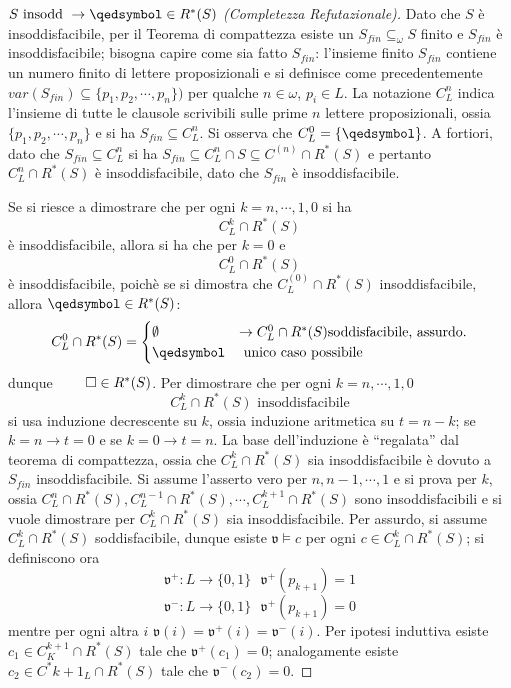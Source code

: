 \begin{proof}[$S \text{ insodd } \rightarrow \qedsymbol \in R^*(S)$ (Completezza Refutazionale)]
        Dato che $S$ è insoddisfacibile, per il Teorema di compattezza esiste 
        un $S_{fin} \subseteq_{\omega} S$ finito e $S_{fin}$ è insoddisfacibile; 
        bisogna capire come sia fatto $S_{fin}$: l'insieme finito $S_{fin}$ contiene 
        un numero finito di lettere proposizionali e si definisce come precedentemente 
        $var(S_{fin}) \subseteq \{p_1, p_2, \cdots, p_n\})$ per qualche $n \in  \omega$, 
        $p_i \in L$.
        La notazione $C^{n}_L$ indica l'insieme di tutte le clausole scrivibili 
        sulle prime $n$ lettere proposizionali, ossia $\{p_1, p_2, \cdots, p_n\}$  
        e si ha $S_{fin} \subseteq C^{n}_L$. 
        Si osserva che $C^{0}_L = \{ \qedsymbol \}$. A fortiori, dato che 
        $S_{fin} \subseteq C^{n}_L$ si ha $S_{fin} \subseteq C^{n}_L \cap S \subseteq C^{(n)} \cap R^*(S)$
        e pertanto $C^{n}_L \cap R^*(S)$ è insoddisfacibile, dato che $S_{fin}$ è 
        insoddisfacibile. 

        Se si riesce a dimostrare che per ogni $ k = n, \cdots, 1,0$ si ha 
        $$
        C^k_L \cap R^*(S)
        $$
        è insoddisfacibile, allora si ha che per $k = 0$ e 
        $$
        C^{0}_L \cap R^*(S)
        $$
        è insoddisfacibile, poichè se si dimostra che $C^(0)_L \cap R^*(S)$ 
        insoddisfacibile, allora $\qedsymbol \in R^*(S)$: 
        $$
        C^{0}_L \cap R^*(S) = 
        \begin{cases}
        \emptyset  & \rightarrow C^0_L \cap R^*(S) \text{soddisfacibile, assurdo.} \\
        \qedsymbol & \text{ unico caso possibile }
        \end{cases}
        $$
        dunque $\qed \in R^*(S)$. Per dimostrare che 
        per ogni $k = n, \cdots, 1, 0$ 
        $$
        C^k_L \cap R^*(S) \text{ insoddisfacibile} 
        $$
        si usa induzione decrescente su $k$, ossia induzione aritmetica 
        su $t = n - k$; se $k = n \rightarrow t = 0$ e se $k = 0 \rightarrow t = n$. 
        La base dell'induzione è ``regalata'' dal teorema di compattezza, 
        ossia che $C^k_L \cap R^*(S)$ sia insoddisfacibile è dovuto a $S_{fin}$ 
        insoddisfacibile. Si assume l'asserto vero per $n, n-1, \cdots, 1$ e 
        si prova per $k$, ossia $C^n_L \cap R^*(S), C^{n-1}_L \cap R^*(S), \cdots, C^{k+1}_L \cap R^*(S)$ 
        sono insoddisfacibili e si vuole dimostrare per $C^k_L \cap R^*(S)$ sia 
        insoddisfacibile. Per assurdo, si assume $C^k_L \cap R^*(S)$ 
        soddisfacibile, dunque esiste $\mathfrak{v} \models c$ per ogni 
        $c \in C^k_L \cap R^*(S)$; si definiscono ora 
        $$
        \mathfrak{v}^+ : L \rightarrow \{0,1\} ~ ~ ~ \mathfrak{v}^+(p_{k+1}) = 1 
        $$
        $$
        \mathfrak{v}^- : L \rightarrow \{0,1\} ~ ~ ~ \mathfrak{v}^+(p_{k+1}) = 0
        $$
        mentre per ogni altra $i$ $\mathfrak{v}(i) = \mathfrak{v}^+(i) = \mathfrak{v}^-(i)$. 
        Per ipotesi induttiva esiste $c_1 \in C^{k+1}_K \cap R^*(S)$ tale che 
        $\mathfrak{v}^+(c_1) = 0$; analogamente esiste $c_2 \in C^*{k+1}_L \cap R^*(S)$ 
        tale che $\mathfrak{v}^-(c_2) = 0$. 
       

\end{proof}

